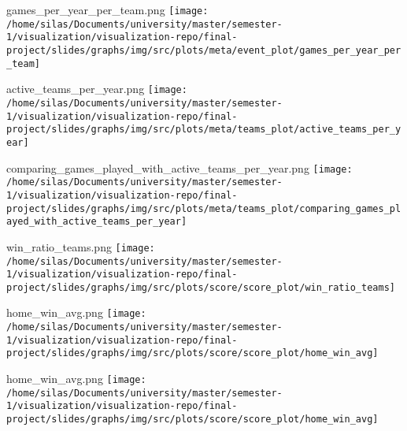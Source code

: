 \documentclass[pdf]{beamer}
\begin{document}
\begin{frame}{games\_per\_year\_per\_team.png}
	\centering
	\texttt{[image: /home/silas/Documents/university/master/semester-1/visualization/visualization-repo/final-project/slides/graphs/img/src/plots/meta/event\_plot/games\_per\_year\_per\_team]}
	
\end{frame}
\begin{frame}{active\_teams\_per\_year.png}
	\centering
	\texttt{[image: /home/silas/Documents/university/master/semester-1/visualization/visualization-repo/final-project/slides/graphs/img/src/plots/meta/teams\_plot/active\_teams\_per\_year]}
	
\end{frame}
\begin{frame}{comparing\_games\_played\_with\_active\_teams\_per\_year.png}
	\centering
	\texttt{[image: /home/silas/Documents/university/master/semester-1/visualization/visualization-repo/final-project/slides/graphs/img/src/plots/meta/teams\_plot/comparing\_games\_played\_with\_active\_teams\_per\_year]}
	
\end{frame}
\begin{frame}{win\_ratio\_teams.png}
	\centering
	\texttt{[image: /home/silas/Documents/university/master/semester-1/visualization/visualization-repo/final-project/slides/graphs/img/src/plots/score/score\_plot/win\_ratio\_teams]}
	
\end{frame}
\begin{frame}{home\_win\_avg.png}
	\centering
	\texttt{[image: /home/silas/Documents/university/master/semester-1/visualization/visualization-repo/final-project/slides/graphs/img/src/plots/score/score\_plot/home\_win\_avg]}
	
\end{frame}
\begin{frame}{home\_win\_avg.png}
	\centering
	\texttt{[image: /home/silas/Documents/university/master/semester-1/visualization/visualization-repo/final-project/slides/graphs/img/src/plots/score/score\_plot/home\_win\_avg]}
	
\end{frame}
\end{document}
